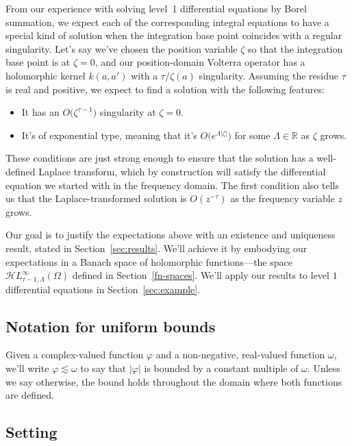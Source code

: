 \documentclass{article}
\theoremstyle{plain}
\newcommand{\R}{\mathbb{R}}
\newcommand{\singexp}[2]{\mathcal{H}L^\infty_{#1, #2}}
\newcommand{\domain}{\Omega}
\begin{document}
From our experience with solving level~1 differential equations by Borel summation, we expect each of the corresponding integral equations to have a special kind of solution when the integration base point coincides with a regular singularity. Let's say we've chosen the position variable $\zeta$ so that the integration base point is at $\zeta = 0$, and our position-domain Volterra operator has a holomorphic kernel $k(a, a')$ with a $\tau/\zeta(a)$ singularity. Assuming the residue $\tau$ is real and positive, we expect to find a solution with the following features:
\begin{itemize}
\item It has an $O\big(\zeta^{\tau-1}\big)$ singularity at $\zeta = 0$.
\item It's of exponential type, meaning that it's $O\big(e^{\Lambda|\zeta|}\big)$ for some $\Lambda \in \R$ as $\zeta$ grows.
\end{itemize}
These conditions are just strong enough to ensure that the solution has a well-defined Laplace transform, which by construction will satisfy the differential equation we started with in the frequency domain. The first condition also tells us that the Laplace-transformed solution is $O(z^{-\tau})$ as the frequency variable $z$ grows.

Our goal is to justify the expectations above with an existence and uniqueness result, stated in Section~\ref{sec:results}. We'll achieve it by embodying our expectations in a Banach space of holomorphic functions---the space $\singexp{\tau-1}{\Lambda}(\domain)$ defined in Section~\ref{fn-spaces}. We'll apply our results to level $1$ differential equations in Section~\ref{sec:example}.
\subsection{Notation for uniform bounds}
Given a complex-valued function $\varphi$ and a non-negative, real-valued function $\omega$, we'll write $\varphi \lesssim \omega$ to say that $|\varphi|$ is bounded by a constant multiple of $\omega$. Unless we say otherwise, the bound holds throughout the domain where both functions are defined.
\subsection{Setting}\label{setting}
\end{document}
